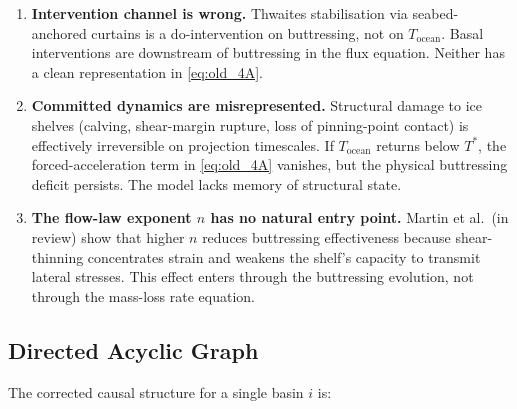\documentclass[11pt]{article}
\theoremstyle{definition}
\begin{document}
\begin{enumerate}
  \item \textbf{Intervention channel is wrong.}  Thwaites stabilisation via seabed-anchored curtains is a do-intervention on buttressing, not on $T_{\text{ocean}}$.  Basal interventions are downstream of buttressing in the flux equation.  Neither has a clean representation in \cref{eq:old_4A}.

  \item \textbf{Committed dynamics are misrepresented.}  Structural damage to ice shelves (calving, shear-margin rupture, loss of pinning-point contact) is effectively irreversible on projection timescales.  If $T_{\text{ocean}}$ returns below $T^{*}$, the forced-acceleration term in \cref{eq:old_4A} vanishes, but the physical buttressing deficit persists.  The model lacks memory of structural state.

  \item \textbf{The flow-law exponent $n$ has no natural entry point.}  Martin et al.\ (in review) show that higher $n$ reduces buttressing effectiveness because shear-thinning concentrates strain and weakens the shelf's capacity to transmit lateral stresses.  This effect enters through the buttressing evolution, not through the mass-loss rate equation.
\end{enumerate}

\subsection{Directed Acyclic Graph}

The corrected causal structure for a single basin $i$ is:
\end{document}
